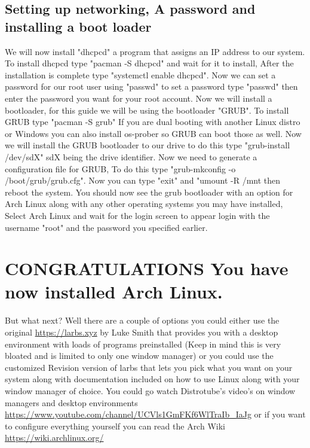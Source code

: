 \documentclass[titlepage]{article}
\begin{document}
  \subsection{Setting up networking, A password and installing a boot loader}
  We will now install "dhcpcd" a program that assigns an IP address to our system. To install dhcpcd type "pacman -S dhcpcd" and wait for it to install, After the installation is complete type "systemctl enable dhcpcd". Now we can set a password for our root user using "passwd" to set a password type "passwd" then enter the password you want for your root account. Now we will install a bootloader, for this guide we will be using the bootloader "GRUB". To install GRUB type "pacman -S grub" If you are dual booting with another Linux distro or Windows you can also install os-prober so GRUB can boot those as well. Now we will install the GRUB bootloader to our drive to do this type "grub-install /dev/sdX" sdX being the drive identifier. Now we need to generate a configuration file for GRUB, To do this type "grub-mkconfig -o /boot/grub/grub.cfg". Now you can type "exit" and "umount -R /mnt then reboot the system. You should now see the grub bootloader with an option for Arch Linux along with any other operating systems you may have installed, Select Arch Linux and wait for the login screen to appear login with the username "root" and the password you specified earlier.\\
\section{CONGRATULATIONS You have now installed Arch Linux.}
  But what next? Well there are a couple of options you could either use the original \url{https://larbs.xyz} by Luke Smith that provides you with a desktop environment with loads of programs preinstalled (Keep in mind this is very bloated and is limited to only one window manager) or you could use the customized Revision version of larbs that lets you pick what you want on your system along with documentation included on how to use Linux along with your window manager of choice. You could go watch Distrotube's video's on window managers and desktop environments \url{https://www.youtube.com/channel/UCVls1GmFKf6WlTraIb_IaJg}
  or if you want to configure everything yourself you can read the Arch Wiki \url{https://wiki.archlinux.org/}
\end{document}

